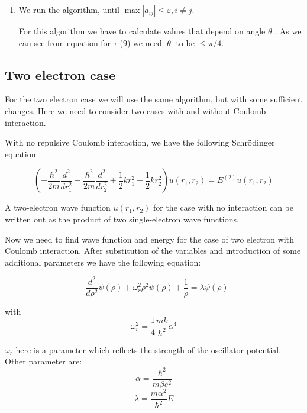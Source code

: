 \documentclass[10pt]{article}
\begin{document}
\begin{enumerate}
\item We run the algorithm, until $\max \left\vert a_{ij}\right\vert \leq
\varepsilon ,i\neq j.$


For this algorithm we have to calculate values that depend on angle $\theta $%
. As we can see from equation for $\tau$ (9) we need  $|\theta |$ to be $\leq
\pi /4$. 
\end{enumerate}
\subsection{Two electron case}
For the two electron case  we will use the same algorithm, but with some
sufficient changes. Here we need to consider two cases with and without
Coulomb interaction.

With no repulsive Coulomb interaction, we have the following Schr\"{o}dinger
equation

\begin{equation}
	\left( -\frac{\hbar ^{2}}{2m}\frac{d^{2}}{dr_{1}^{2}}-\frac{\hbar ^{2}}{2m}%
	\frac{d^{2}}{dr_{2}^{2}}+\frac{1}{2}kr_{1}^{2}+\frac{1}{2}kr_{2}^{2}\right)
	u(r_{1},r_{2})=E^{(2)}u(r_{1},r_{2})
\end{equation}

	A two-electron wave function $u(r_{1},r_{2})$ for the case with no
	interaction can be written out as the product of two single-electron wave
	functions.
	
	Now we need to find wave function and energy for the case of two electron
	with Coulomb interaction. After substitution of the variables and
	introduction of some additional parameters we have the following equation:
	
	\begin{equation}
		-\frac{d^{2}}{d\rho ^{2}}\psi (\rho )+\omega _{r}^{2}\rho ^{2}\psi (\rho )+%
		\frac{1}{\rho }=\lambda \psi (\rho )
	\end{equation}
	
	with 
	\begin{equation}
		\omega _{r}^{2}=\frac{1}{4}\frac{mk}{\hbar ^{2}}\alpha ^{4}
	\end{equation}
	
	$\omega _{r}$ here is a parameter which reflects the strength of the
	oscillator potential. Other parameter are:%
	\begin{equation}
		\alpha =\frac{\hbar ^{2}}{m\beta e^{2}}
	\end{equation}%
	\begin{equation}
		\lambda =\frac{m\alpha ^{2}}{\hbar ^{2}}E
	\end{equation}
	
\end{document}
